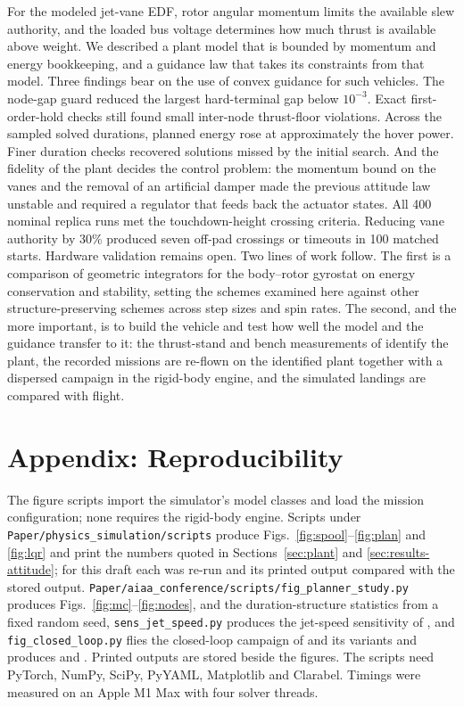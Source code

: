 \documentclass[10pt,letterpaper]{article}
\begin{document}
For the modeled jet-vane EDF, rotor angular momentum limits the available slew authority, and the loaded bus voltage determines how much thrust is available above weight.
We described a plant model that is bounded by momentum and energy bookkeeping, and a guidance law that takes its constraints from that model.
Three findings bear on the use of convex guidance for such vehicles.
The node-gap guard reduced the largest hard-terminal gap below $10^{-3}$. Exact first-order-hold checks still found small inter-node thrust-floor violations.
Across the sampled solved durations, planned energy rose at approximately the hover power. Finer duration checks recovered solutions missed by the initial search.
And the fidelity of the plant decides the control problem: the momentum bound on the vanes and the removal of an artificial damper made the previous attitude law unstable and required a regulator that feeds back the actuator states.
All 400 nominal replica runs met the touchdown-height crossing criteria. Reducing vane authority by 30\% produced seven off-pad crossings or timeouts in 100 matched starts. Hardware validation remains open.
Two lines of work follow.
The first is a comparison of geometric integrators for the body--rotor gyrostat on energy conservation and stability, setting the schemes examined here against other structure-preserving schemes across step sizes and spin rates.
The second, and the more important, is to build the vehicle and test how well the model and the guidance transfer to it: the thrust-stand and bench measurements of  identify the plant, the recorded missions are re-flown on the identified plant together with a dispersed campaign in the rigid-body engine, and the simulated landings are compared with flight.

\section*{Appendix: Reproducibility}

The figure scripts import the simulator's model classes and load the mission configuration; none requires the rigid-body engine.
Scripts under \texttt{Paper/physics\_simulation/scripts} produce Figs.~\ref{fig:spool}--\ref{fig:plan} and \ref{fig:lqr} and print the numbers quoted in Sections~\ref{sec:plant} and \ref{sec:results-attitude}; for this draft each was re-run and its printed output compared with the stored output.
\texttt{Paper/aiaa\_conference/scripts/fig\_planner\_study.py} produces Figs.~\ref{fig:mc}--\ref{fig:nodes},  and the duration-structure statistics from a fixed random seed, \texttt{sens\_jet\_speed.py} produces the jet-speed sensitivity of , and \texttt{fig\_closed\_loop.py} flies the closed-loop campaign of  and its variants and produces  and .
Printed outputs are stored beside the figures.
The scripts need PyTorch, NumPy, SciPy, PyYAML, Matplotlib and Clarabel.
Timings were measured on an Apple M1 Max with four solver threads.
\end{document}
